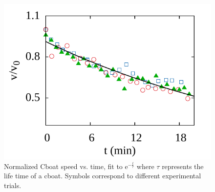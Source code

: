 \documentclass[journal=langd5, manuscript=article, layout=twocolumn]{achemso}
\begin{document}
\begin{figure}[ht]
    \begin{center}
       \includegraphics[width=\linewidth]{lifetime.pdf}
    \end{center}
    \caption{Normalized Cboat speed vs. time, fit to $\mathrm{e}^{-\frac{t}{\tau}}$ where $\tau$ represents the life time of a cboat. Symbols correspond to different experimental trials.}
    \label{fig:lifetime}
\end{figure}
\end{document}

